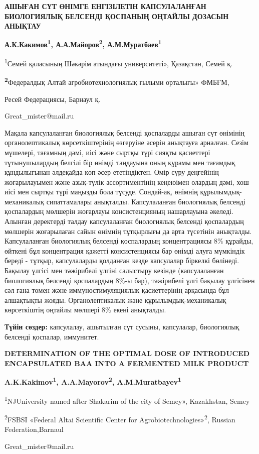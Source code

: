 \begin{center}
{\large\bfseries АШЫҒАН СҮТ ӨНІМГЕ ЕНГІЗІЛЕТІН КАПСУЛАЛАНҒАН БИОЛОГИЯЛЫҚ БЕЛСЕНДІ
ҚОСПАНЫҢ ОҢТАЙЛЫ ДОЗАСЫН АНЫҚТАУ}

{\bfseries А.К.Какимов\textsuperscript{1}, А.А.Майоров\textsuperscript{2},
А.М.Муратбаев\textsuperscript{1 }}

\textsuperscript{1}Семей қаласының Шәкәрім атындағы университеті», Қазақстан, Семей қ.

{\bfseries \textsuperscript{2}}Федералдық Алтай агробиотехнологиялық ғылыми
орталығы» ФМБҒМ,

Ресей Федерациясы, Барнаул қ.

Great\_mister@mail.ru
\end{center}

Мақала капсулаланған биологиялық белсенді қоспаларды ашыған сүт өнімінің
органолептикалық көрсеткіштерінің өзгеруіне әсерін анықтауға арналған.
Сезім мүшелері, тағамның дәмі, иісі және сыртқы түрі сияқты қасиеттері
тұтынушылардың белгілі бір өнімді таңдауына оның құрамы мен тағамдық
құндылығынан әлдеқайда көп әсер ететіндіктен. Өмір сүру деңгейінің
жоғарылауымен және азық-түлік ассортиментінің кеңеюімен олардың дәмі,
хош иісі мен сыртқы түрі маңызды бола түсуде. Сондай-ақ, өнімнің
құрылымдық-механикалық сипаттамалары анықталды. Капсулаланған
биологиялық белсенді қоспалардың мөлшерін жоғарлауы консистенцияның
нашарлауына әкеледі. Алынған деректерді талдау капсулаланған биологиялық
белсенді қоспалардың мөлшерін жоғарылаған сайын өнімнің тұтқырлығы да
арта түсетінін анықталды. Капсулаланған биологиялық белсенді қоспалардың
концентрациясы 8\% құрайды, өйткені бұл концентрация қажетті
консистенциясы бар өнімді алуға мүмкіндік береді - тұтқыр, капсулаларды
қолданған кезде капсулалар біркелкі бөлінеді. Бақылау үлгісі мен
тәжірибелі үлгіні салыстыру кезінде (капсулаланған биологиялық белсенді
қоспалардың 8\%-ы бар), тәжірибелі үлгі бақылау үлгісінен сәл ғана төмен
және иммуностимуляциялық қасиеттерінің арқасында бұл алшақтықты жояды.
Органолептикалық және құрылымдық-механикалық көрсеткіштің оңтайлы
мөлшері 8\% екені анықталды.

{\bfseries Түйін сөздер:} капсулалау, ашытылған сүт сусыны, капсулалар,
биологиялық белсенді қоспалар, иммунитет.

\begin{center}
{\large\bfseries DETERMINATION OF THE OPTIMAL DOSE OF INTRODUCED ENCAPSULATED BAA
INTO A FERMENTED MILK PRODUCT}

{\bfseries A.K.Kakimov\textsuperscript{1}, A.A.Mayorov\textsuperscript{2},
A.M.Muratbayev\textsuperscript{1}}

\textsuperscript{1}NJUniversity named after Shakarim of the city of
Semey», Kazakhstan, Semey

\textsuperscript{2}FSBSI «Federal Altai Scientific Center for
Agrobiotechnologies»\textsuperscript{2}, Russian Federation,Barnaul

Great\_mister@mail.ru
\end{center}

